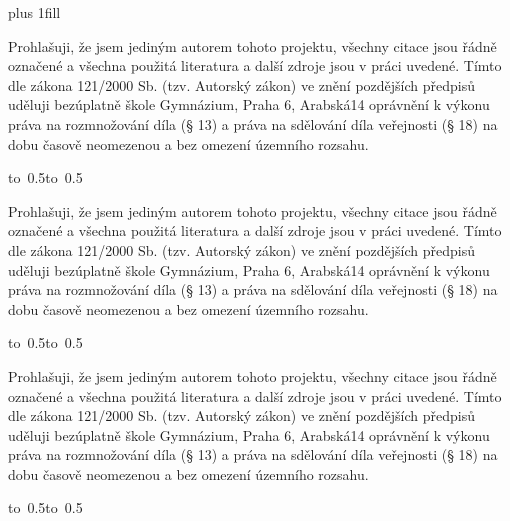 
\openright
\hypersetup{pageanchor=true}
\pagestyle{plain}
\vglue 0pt plus 1fill

\noindent Prohlašuji, že jsem jediným autorem tohoto projektu, všechny citace
jsou řádně označené a všechna použitá literatura a další zdroje jsou v práci
uvedené.  Tímto dle zákona 121/2000 Sb. (tzv. Autorský zákon) ve znění
pozdějších předpisů uděluji bezúplatně škole Gymnázium, Praha 6, Arabská14
oprávnění k výkonu práva na rozmnožování díla (§ 13) a práva na sdělování díla
veřejnosti (§ 18) na dobu časově neomezenou a bez omezení územního rozsahu.

\vspace{10mm}

\hbox{\hbox to 0.5\hbox to 0.5}

\vspace{20mm}

\noindent Prohlašuji, že jsem jediným autorem tohoto projektu, všechny citace
jsou řádně označené a všechna použitá literatura a další zdroje jsou v práci
uvedené.  Tímto dle zákona 121/2000 Sb. (tzv. Autorský zákon) ve znění
pozdějších předpisů uděluji bezúplatně škole Gymnázium, Praha 6, Arabská14
oprávnění k výkonu práva na rozmnožování díla (§ 13) a práva na sdělování díla
veřejnosti (§ 18) na dobu časově neomezenou a bez omezení územního rozsahu.

\vspace{10mm}

\hbox{\hbox to 0.5\hbox to 0.5}

\vspace{20mm}
\noindent Prohlašuji, že jsem jediným autorem tohoto projektu, všechny citace
jsou řádně označené a všechna použitá literatura a další zdroje jsou v práci
uvedené.  Tímto dle zákona 121/2000 Sb. (tzv. Autorský zákon) ve znění
pozdějších předpisů uděluji bezúplatně škole Gymnázium, Praha 6, Arabská14
oprávnění k výkonu práva na rozmnožování díla (§ 13) a práva na sdělování díla
veřejnosti (§ 18) na dobu časově neomezenou a bez omezení územního rozsahu.

\vspace{10mm}

\hbox{\hbox to 0.5\hbox to 0.5}

